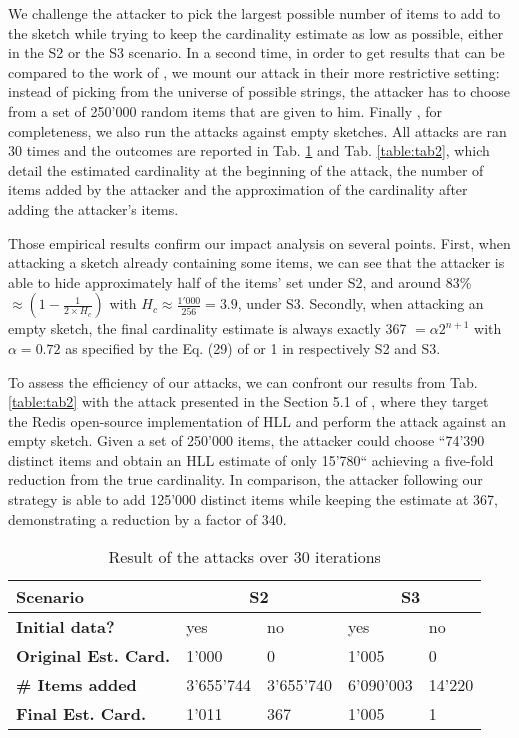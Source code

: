 \documentclass{IEEEtran}
\begin{document}
We challenge the attacker to pick the largest possible number of items to add to the sketch while trying to keep the cardinality estimate as low as possible, either in the S2 or the S3 scenario. In a second time, in order to get results that can be compared to the work of \cite{hllvuln}, we mount our attack in their more restrictive setting: instead of picking from the universe of possible strings, the attacker has to choose from a set of 250'000 random items that are given to him. Finally , for completeness, we also run the attacks against empty sketches. All attacks are ran 30 times and the outcomes are reported in Tab. \ref{table:tab1} and Tab. \ref{table:tab2}, which detail the estimated cardinality at the beginning of the attack, the number of items added by the attacker and the approximation of the cardinality after adding the attacker's items.

Those empirical results confirm our impact analysis on several points. First, when attacking a sketch already containing some items, we can see that the attacker is able to hide approximately half of the items' set under S2, and around 83\%%
$\approx (1-\frac{1}{2\times H_c})$ with $H_c\approx\frac{1'000}{256}=3.9$, under S3.
Secondly, when attacking an empty sketch, the final cardinality estimate is always exactly 367 $=\alpha2^{n+1}$ with $\alpha = 0.72$ as specified by the Eq. (29) of \cite{hll2} or 1 in respectively S2 and S3.

To assess the efficiency of our attacks, we can confront our results from Tab. \ref{table:tab2} with the attack presented in the Section 5.1 of \cite{hllvuln}, where they target the Redis \cite{redishll} open-source implementation of HLL and perform the attack against an empty sketch. Given a set of 250'000 items, the attacker could choose ``74'390 distinct items and obtain an HLL estimate of only 15'780`` achieving a five-fold reduction from the true cardinality. In comparison, the attacker following our strategy is able to add 125'000 distinct items while keeping the estimate at 367, demonstrating a reduction by a factor of 340. 

\begin{table}[h]
\caption{Result of the attacks over 30 iterations}
\begin{tabular}{| m{8.5em} | m{4em} | m{4em} | m{4em} | m{4em} |}
    \hline
    \textbf{Scenario} & \multicolumn{2}{c|}{S2} & \multicolumn{2}{c|}{S3} \\ \hline
    \textbf{Initial data?} & yes & no & yes & no \\ \hline
    \textbf{Original Est. Card.} & 1'000 & 0 & 1'005 & 0 \\ \hline
    \textbf{\# Items added} & 3'655'744 & 3'655'740 & 6'090'003 & 14'220 \\ \hline
    \textbf{Final Est. Card.} & 1'011 & 367 & 1'005 & 1 \\ \hline
\end{tabular}
\label{table:tab1}
\end{table}
\end{document}
